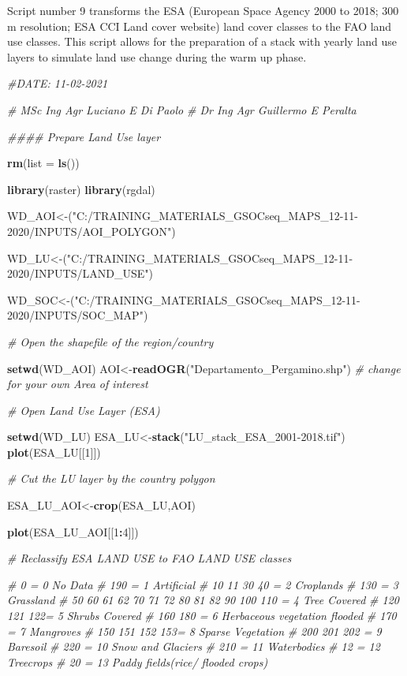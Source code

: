 \documentclass[
  10pt,
  b5paper,
]{book}
\newenvironment{Shaded}{\begin{snugshade}}{\end{snugshade}}
\newcommand{\CommentTok}[1]{\textcolor[rgb]{0.56,0.35,0.01}{\textit{#1}}}
\newcommand{\DataTypeTok}[1]{\textcolor[rgb]{0.13,0.29,0.53}{#1}}
\newcommand{\DecValTok}[1]{\textcolor[rgb]{0.00,0.00,0.81}{#1}}
\newcommand{\KeywordTok}[1]{\textcolor[rgb]{0.13,0.29,0.53}{\textbf{#1}}}
\newcommand{\NormalTok}[1]{#1}
\newcommand{\OperatorTok}[1]{\textcolor[rgb]{0.81,0.36,0.00}{\textbf{#1}}}
\newcommand{\StringTok}[1]{\textcolor[rgb]{0.31,0.60,0.02}{#1}}
\begin{document}
Script number 9 transforms the ESA (European Space Agency 2000 to 2018; 300 m resolution; ESA CCI Land cover website) land cover classes to the FAO land use classes. This script allows for the preparation of a stack with yearly land use layers to simulate land use change during the warm up phase.

\begin{Shaded}
\begin{Highlighting}[]
\CommentTok{#DATE: 11-02-2021}

\CommentTok{# MSc Ing Agr Luciano E Di Paolo}
\CommentTok{# Dr Ing Agr Guillermo E Peralta}

\CommentTok{#### Prepare Land Use layer }

\KeywordTok{rm}\NormalTok{(}\DataTypeTok{list =} \KeywordTok{ls}\NormalTok{())}

\KeywordTok{library}\NormalTok{(raster)}
\KeywordTok{library}\NormalTok{(rgdal)}

\NormalTok{WD_AOI<-(}\StringTok{"C:/TRAINING_MATERIALS_GSOCseq_MAPS_12-11-2020/INPUTS/AOI_POLYGON"}\NormalTok{)}

\NormalTok{WD_LU<-(}\StringTok{"C:/TRAINING_MATERIALS_GSOCseq_MAPS_12-11-2020/INPUTS/LAND_USE"}\NormalTok{)}

\NormalTok{WD_SOC<-(}\StringTok{"C:/TRAINING_MATERIALS_GSOCseq_MAPS_12-11-2020/INPUTS/SOC_MAP"}\NormalTok{)}

\CommentTok{# Open the shapefile of the region/country}

\KeywordTok{setwd}\NormalTok{(WD_AOI)}
\NormalTok{AOI<-}\KeywordTok{readOGR}\NormalTok{(}\StringTok{"Departamento_Pergamino.shp"}\NormalTok{) }\CommentTok{# change for your own Area of interest}

\CommentTok{# Open Land Use Layer (ESA)}

\KeywordTok{setwd}\NormalTok{(WD_LU)}
\NormalTok{ESA_LU<-}\KeywordTok{stack}\NormalTok{(}\StringTok{"LU_stack_ESA_2001-2018.tif"}\NormalTok{)}
\KeywordTok{plot}\NormalTok{(ESA_LU[[}\DecValTok{1}\NormalTok{]])}

\CommentTok{# Cut the LU layer by the country polygon}

\NormalTok{ESA_LU_AOI<-}\KeywordTok{crop}\NormalTok{(ESA_LU,AOI)}

\KeywordTok{plot}\NormalTok{(ESA_LU_AOI[[}\DecValTok{1}\OperatorTok{:}\DecValTok{4}\NormalTok{]])}

\CommentTok{# Reclassify ESA LAND USE to FAO LAND USE classes}

\CommentTok{#   0 = 0	  No Data}
\CommentTok{#	190 = 1 Artificial}
\CommentTok{#	10 11 30 40 = 2 Croplands}
\CommentTok{#	130 = 3 Grassland}
\CommentTok{#	50 60 61 62 70 71 72 80 81 82 90 100 110 = 4 Tree Covered}
\CommentTok{#	120 121 122= 5 Shrubs Covered}
\CommentTok{#	160 180 = 6 Herbaceous vegetation flooded}
\CommentTok{#	170 = 7 Mangroves}
\CommentTok{#	150 151 152 153= 8 Sparse Vegetation}
\CommentTok{#	200 201 202 = 9 Baresoil}
\CommentTok{#	220 = 10 Snow and Glaciers}
\CommentTok{#	210 = 11 Waterbodies}
\CommentTok{#	12  = 12 Treecrops}
\CommentTok{# 20 = 13 Paddy fields(rice/ flooded crops)}


\end{Highlighting}
\end{Shaded}
\end{document}
